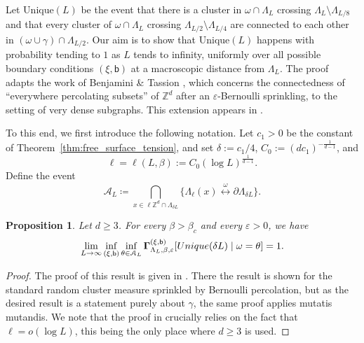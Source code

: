 \documentclass[11pt,a4paper]{article}
\newtheorem{proposition}[theorem]{Proposition}
\theoremstyle{definition}
\numberwithin{equation}{section}
\newcommand\Z{\mathbb{Z}}
\begin{document}
Let $\mathrm{Unique}(L)$ be the event that there is a cluster in $\omega\cap \Lambda_{L}$ crossing $\Lambda_L\setminus \Lambda_{L/8}$ and that every cluster of $\omega\cap \Lambda_L$ crossing $\Lambda_{L/2}\setminus \Lambda_{L/4}$ are connected to each other in $(\omega\cup\gamma)\cap \Lambda_{L/2}$. 
Our aim is to show that $\mathrm{Unique}(L)$ happens with probability tending to $1$ as $L$ tends to infinity, uniformly over all possible boundary conditions $(\xi,\mathsf{b})$ at a macroscopic distance from $\Lambda_L$.
The proof adapts the work of Benjamini \& Tassion \cite{BenjaminiTassion}, which concerns the connectedness of ``everywhere percolating subsets'' of $\mathbb{Z}^d$ after an $\varepsilon$-Bernoulli sprinkling, to the setting of very dense subgraphs. This extension appears in \cite{Severo24}.

To this end, we first introduce the following notation.
Let $c_1>0$ be the constant of Theorem~\ref{thm:free_surface_tension}, and set $\delta:=c_1/4$, $C_0:=(dc_1)^{-\frac{1}{d-1}}$, and 
\begin{equation}
\ell=\ell(L,\beta):=C_0 (\log{L})^{\frac{1}{d-1}}.    
\end{equation}
Define the event
\begin{equation}
\mathcal{A}_L\coloneqq \bigcap_{x\in \ell\Z^d\cap\Lambda_{\delta L}} \{\Lambda_\ell(x) \overset{\omega}{\longleftrightarrow} \partial \Lambda_{\delta L}\}.
\end{equation}

\begin{proposition}\label{prop: cond uniqueness}
Let $d\geq3$. For every $\beta>\beta_c$ and every $\varepsilon>0$, we have 
\begin{equation}
\lim_{L\to\infty} \inf_{(\xi,\mathsf{b})} \inf_{\theta \in \mathcal{A}_L} {\boldsymbol \Gamma}^{(\xi,\mathsf{b})}_{\Lambda_L,\beta,\varepsilon}[\textup{Unique}(\delta L) \mid \omega=\theta]=1.    
\end{equation}
\end{proposition}
\begin{proof}
The proof of this result is given in \cite[Proposition 2.2]{Severo24}. There the result is shown for the standard random cluster measure sprinkled by Bernoulli percolation, but as the desired result is a statement purely about $\gamma$, the same proof applies mutatis mutandis. We note that the proof in \cite[Proposition 2.2]{Severo24} crucially relies on the fact that $\ell=o(\log L)$, this being the only place where $d\geq3$ is used.
\end{proof}
\end{document}
